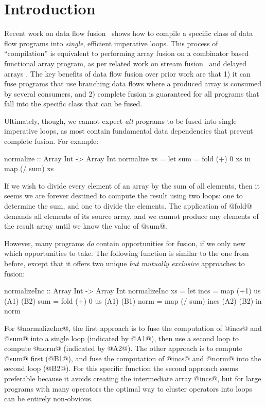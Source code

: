\section{Introduction}

Recent work on data flow fusion~\cite{lippmeier2013data} shows how to compile a specific class of data flow programs into \emph{single}, efficient imperative loops. This process of ``compilation'' is equivalent to performing array fusion on a combinator based functional array program, as per related work on stream fusion~\cite{coutts2007streamfusion} and delayed arrays \cite{repa}. The key benefits of data flow fusion over prior work are that 1) it can fuse programs that use branching data flows where a produced array is consumed by several consumers, and 2) complete fusion is guaranteed for all programs that fall into the specific class that can be fused. 



Ultimately, though, we cannot expect \emph{all} programs to be fused into single imperative loops, as most contain fundamental data dependencies that prevent complete fusion. For example:
\begin{code}
  normalize :: Array Int -> Array Int
  normalize xs = let sum = fold (+) 0 xs
                 in  map (/ sum) xs
\end{code}

If we wish to divide every element of an array by the sum of all elements, then it seems we are forever destined to compute the result using two loops: one to determine the sum, and one to divide the elements. The application of @fold@ demands all elements of its source array, and we cannot produce any elements of the result array until we know the value of @sum@.

However, many programs \emph{do} contain opportunities for fusion, if we only new which opportunities to take. The following function is similar to the one from before, except that it offers two unique \emph{but mutually exclusive} approaches to fusion:
\begin{code}
 normalizeInc :: Array Int -> Array Int
 normalizeInc xs
  = let incs = map  (+1)    us      (A1) (B2)
        sum  = fold (+) 0   us      (A1) (B1)
        norm = map  (/ sum) incs    (A2) (B2)
    in  norm
\end{code}

For @normalizeInc@, the first approach is to fuse the computation of @incs@ and @sum@ into a single loop (indicated by @A1@), then use a second loop to compute @norm@ (indicated by @A2@). The other approach is to compute @sum@ first (@B1@), and fuse the computation of @incs@ and @norm@ into the second loop (@B2@). For this specific function the second approach seems preferable because it avoids creating the intermediate array @incs@, but for large programs with many operators the optimal way to cluster operators into loops can be entirely non-obvious. 

